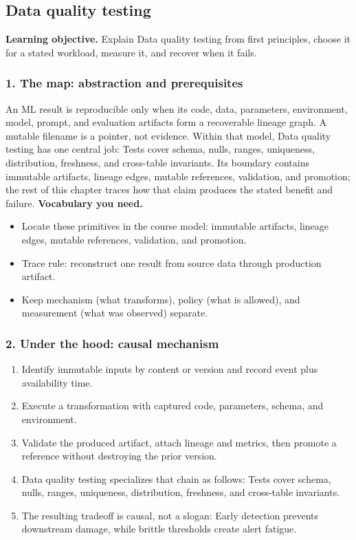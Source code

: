 \subsection{Data quality testing}
\textbf{Learning objective.} Explain Data quality testing from first principles, choose it for a stated workload, measure it, and recover when it fails.
\subsubsection*{1. The map: abstraction and prerequisites}
An ML result is reproducible only when its code, data, parameters, environment, model, prompt, and evaluation artifacts form a recoverable lineage graph. A mutable filename is a pointer, not evidence.
Within that model, Data quality testing has one central job: Tests cover schema, nulls, ranges, uniqueness, distribution, freshness, and cross-table invariants. Its boundary contains immutable artifacts, lineage edges, mutable references, validation, and promotion; the rest of this chapter traces how that claim produces the stated benefit and failure.
\textbf{Vocabulary you need.}\begin{itemize}
\item Locate these primitives in the course model: immutable artifacts, lineage edges, mutable references, validation, and promotion.
\item Trace rule: reconstruct one result from source data through production artifact.
\item Keep mechanism (what transforms), policy (what is allowed), and measurement (what was observed) separate.
\end{itemize}
\subsubsection*{2. Under the hood: causal mechanism}\begin{enumerate}
\item Identify immutable inputs by content or version and record event plus availability time.
\item Execute a transformation with captured code, parameters, schema, and environment.
\item Validate the produced artifact, attach lineage and metrics, then promote a reference without destroying the prior version.
\item Data quality testing specializes that chain as follows: Tests cover schema, nulls, ranges, uniqueness, distribution, freshness, and cross-table invariants.
\item The resulting tradeoff is causal, not a slogan: Early detection prevents downstream damage, while brittle thresholds create alert fatigue.
\end{enumerate}
